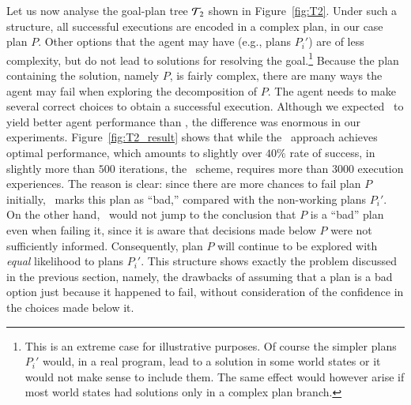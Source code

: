 Let us now analyse the goal-plan tree ${\mathcal{T}}_2$ shown in Figure~\ref{fig:T2}.
Under such a structure, all successful executions are encoded in a complex plan,
in our case plan $P$. Other options that the agent may have (e.g., plans $P_i'$)
are of less complexity, but do not lead to solutions for resolving the
goal.\footnote{This is an extreme case for illustrative purposes. Of course the
simpler plans $P_i'$ would, in a real program, lead to a solution in some world
states or it would not make sense to include them. The same effect would however
arise if most world states had solutions only in a complex plan branch.}
Because the plan containing the solution, namely $P$, is fairly complex, there
are many ways the agent may fail when exploring the decomposition of $P$. The
agent needs to make several correct choices to obtain a successful execution.
Although we expected \BUL\ to yield better agent performance than \CL, the
difference was enormous in our experiments. Figure~\ref{fig:T2_result} shows that
while the \BUL\ approach achieves optimal performance, which amounts to slightly
over $40\%$ rate of success, in slightly more than $500$ iterations, the \CL\
scheme, requires more than $3000$ execution experiences. The reason is clear:
since there are more chances to fail plan $P$ initially, \CL\ marks this plan as
``bad,'' compared with the non-working plans $P_i'$. On the other hand, \BUL\
would not jump to the conclusion that $P$ is a ``bad'' plan even when failing it,
since it is aware that decisions made below $P$ were not sufficiently informed.
Consequently, plan $P$ will continue to be explored with \emph{equal} likelihood
to plans $P_i'$.
This structure shows exactly the problem discussed in the previous section,
namely, the drawbacks of assuming that a plan is a bad option just because it
happened to fail, without consideration of the confidence in the choices made
below it.


